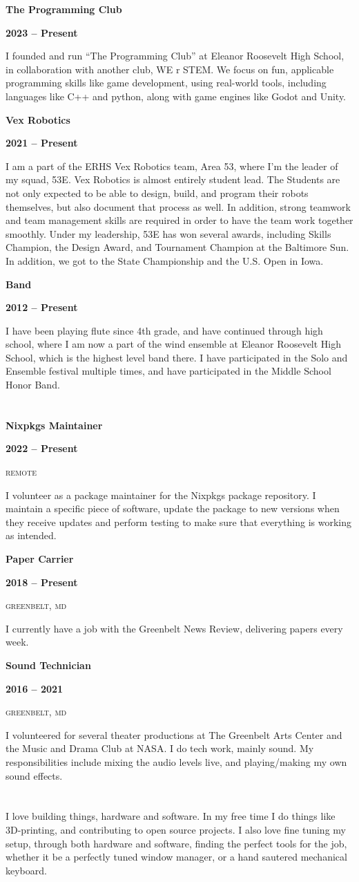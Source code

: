 \documentclass[12pt]{article}
\newcommand{\mainColor}{blue} %
\newcommand{\negshspace}{\hspace*{-0.5em}}
\newcommand{\neghvspace}{\vspace*{-1.5em}}
\newcommand{\svspace}{\vspace*{0.5em}}
\newcommand{\boxAwesome}[1]{
	\makebox[1.50em][c]{
		#1
	}
}
\newcommand{\cvsection}[2]{
	\section*{
	  \color{\mainColor} \boxAwesome{#1} \negshspace \StrSplit{#2}{3}{\csA}{\csB} \csA\color{black}\csB
	 }
}
\newcommand{\work}[4]{
	\noindent \textbf{#1}
	\hfill %
	\parbox{8em}{
		\centering\textbf{#2}
	} \par
	\noindent \color{grayShy} \textsc{\MakeLowercase{#3}} \color{black} \par
	#4
	\normalsize \par
}
\newcommand{\activity}[3]{
	\noindent \textbf{#1}
	\hfill %
	\parbox{8em}{
		\centering\textbf{#2}
	} \par
	#3
	\normalsize \par
}
\begin{document}
\activity{The Programming Club}{2023 -- Present}{I founded and run “The Programming Club” at Eleanor Roosevelt High School, in collaboration with another club, WE r STEM. We focus on fun, applicable programming skills like game development, using real-world tools, including languages like C++ and python, along with game engines like Godot and Unity. }
\activity{Vex Robotics}{2021 -- Present}{I am a part of the ERHS Vex Robotics team, Area 53, where I’m the leader of my squad, 53E. Vex Robotics is almost entirely student lead. The Students are not only expected to be able to design, build, and program their robots themselves, but also document that process as well. In addition, strong teamwork and team management skills are required in order to have the team work together smoothly. Under my leadership, 53E has won several awards, including Skills Champion, the Design Award, and Tournament Champion at the Baltimore Sun. In addition, we got to the State Championship and the U.S. Open in Iowa.}
\activity{Band}{2012 -- Present}{I have been playing flute since 4th grade, and have continued through high school, where I am now a part of the wind ensemble at Eleanor Roosevelt High School, which is the highest level band there. I have participated in the Solo and Ensemble festival multiple times, and have participated in the Middle School Honor Band.}


\neghvspace
\cvsection{\faBriefcase}{Work Experience}
\svspace

\work{Nixpkgs Maintainer}{2022 -- Present}{Remote}{I volunteer as a package maintainer for the Nixpkgs package repository. I maintain a specific piece of software, update the package to new versions when they receive updates and perform testing to make sure that everything is working as intended.}

\work{Paper Carrier}{2018 -- Present}{Greenbelt, MD}{I currently have a job with the Greenbelt News Review, delivering papers every week.}

\work{Sound Technician}{2016 -- 2021}{Greenbelt, MD}{I volunteered for several theater productions at The Greenbelt Arts Center and the Music and Drama Club at NASA. I do tech work, mainly sound. My responsibilities include mixing the audio levels live, and playing/making my own sound effects.}


\neghvspace
\cvsection{\faPuzzlePiece}{Hobbies \& Interests}
\svspace

I love building things, hardware and software. In my free time I do things like 3D-printing, and contributing to open source projects. I also love fine tuning my setup, through both hardware and software, finding the perfect tools for the job, whether it be a perfectly tuned window manager, or a hand sautered mechanical keyboard.
\end{document}
